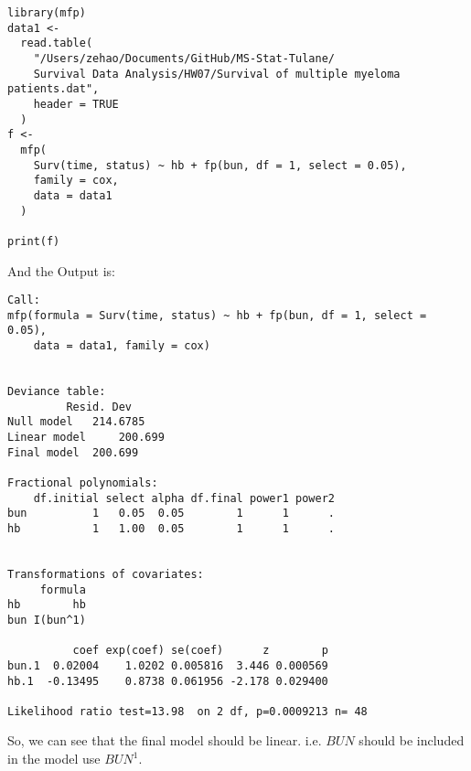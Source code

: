 \documentclass{elegantbook}
\begin{document}
\begin{solution}
    \begin{verbatim}
library(mfp)
data1 <-
  read.table(
    "/Users/zehao/Documents/GitHub/MS-Stat-Tulane/
    Survival Data Analysis/HW07/Survival of multiple myeloma patients.dat",
    header = TRUE
  )
f <-
  mfp(
    Surv(time, status) ~ hb + fp(bun, df = 1, select = 0.05),
    family = cox,
    data = data1
  )

print(f)
    \end{verbatim}
    And the Output is:
    \begin{verbatim}
Call:
mfp(formula = Surv(time, status) ~ hb + fp(bun, df = 1, select = 0.05), 
    data = data1, family = cox)


Deviance table:
 		 Resid. Dev
Null model   214.6785
Linear model	 200.699
Final model	 200.699

Fractional polynomials:
    df.initial select alpha df.final power1 power2
bun          1   0.05  0.05        1      1      .
hb           1   1.00  0.05        1      1      .


Transformations of covariates:
     formula
hb        hb
bun I(bun^1)

          coef exp(coef) se(coef)      z        p
bun.1  0.02004    1.0202 0.005816  3.446 0.000569
hb.1  -0.13495    0.8738 0.061956 -2.178 0.029400

Likelihood ratio test=13.98  on 2 df, p=0.0009213 n= 48 
    \end{verbatim}
    So, we can see that the final model should be linear. i.e. $BUN$ should be included in the model use $BUN^{1}$. 
\end{solution}
\end{document}
